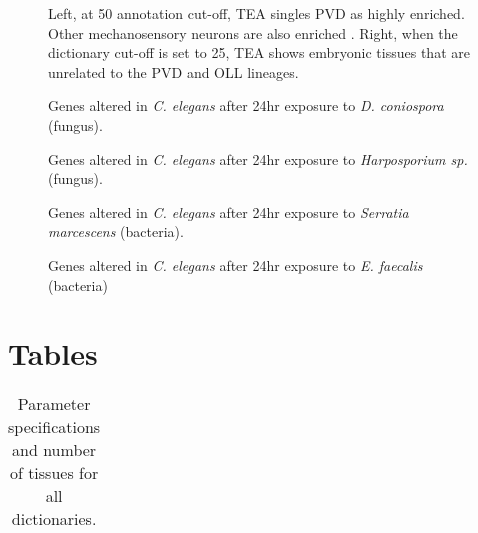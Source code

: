 \documentclass[linenumbers, doublespacing]{bmcart}
\begin{document}
\begin{backmatter}
\begin{figure}[h!]
  \caption{
      Left, at 50 annotation cut-off, TEA singles PVD as highly enriched. Other mechanosensory neurons are also enriched . Right, when the dictionary cut-off is set to 25, TEA shows embryonic tissues that are unrelated to the PVD and OLL lineages.}
	  \label{fig:ovdoll}
      \end{figure}
%
%
%
%
\begin{figure}[h!]
  \caption{
      Genes altered in \emph{C. elegans} after 24hr exposure to \emph{D. coniospora} (fungus).}
      \end{figure}
\begin{figure}[h!]
  \caption{
      Genes altered in \emph{C. elegans} after 24hr exposure to \emph{Harposporium sp.} (fungus).}
      \end{figure}
\begin{figure}[h!]
  \caption{
      Genes altered in \emph{C. elegans} after 24hr exposure to \emph{Serratia marcescens} (bacteria).}
      \end{figure}
\begin{figure}[h!]
  \caption{
      Genes altered in \emph{C. elegans} after 24hr exposure to \emph{E. faecalis} (bacteria)}
      \end{figure}


\section*{Tables}
\begin{table}[h!]
\caption{Parameter specifications and number of tissues for all dictionaries.}
      \begin{tabular}{cccc}
        \hline
      \end{tabular}
	  \label{tab:DictionarySpecs}
\end{table}


\end{backmatter}
\end{document}
